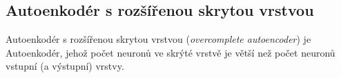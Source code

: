 \subsection{Autoenkodér s rozšířenou skrytou vrstvou}
\label{sec:overcomplete_autoencoder}
Autoenkodér s rozšířenou skrytou vrstvou (\emph{overcomplete autoencoder}) je Autoenkodér, jehož počet neuronů ve skrýté vrstvě je větší než počet neuronů vstupní (a výstupní) vrstvy. \cite{Charte2018}